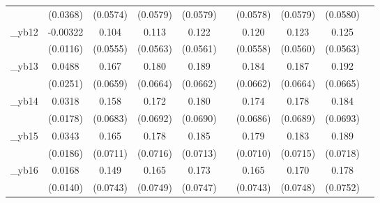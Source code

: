 \begin{table}[htbp]
\begin{tabular}{l*{9}{c}}
            &    (0.0368)         &    (0.0574)         &    (0.0579)         &    (0.0579)         &                     &    (0.0578)         &    (0.0579)         &    (0.0580)         &                     \\
[1em]
\_yb12       &    -0.00322         &       0.104\sym{*}  &       0.113\sym{**} &       0.122\sym{**} &                     &       0.120\sym{**} &       0.123\sym{**} &       0.125\sym{**} &                     \\
            &    (0.0116)         &    (0.0555)         &    (0.0563)         &    (0.0561)         &                     &    (0.0558)         &    (0.0560)         &    (0.0563)         &                     \\
[1em]
\_yb13       &      0.0488\sym{*}  &       0.167\sym{**} &       0.180\sym{***}&       0.189\sym{***}&                     &       0.184\sym{***}&       0.187\sym{***}&       0.192\sym{***}&                     \\
            &    (0.0251)         &    (0.0659)         &    (0.0664)         &    (0.0662)         &                     &    (0.0662)         &    (0.0664)         &    (0.0665)         &                     \\
[1em]
\_yb14       &      0.0318\sym{*}  &       0.158\sym{**} &       0.172\sym{**} &       0.180\sym{***}&                     &       0.174\sym{**} &       0.178\sym{**} &       0.184\sym{***}&                     \\
            &    (0.0178)         &    (0.0683)         &    (0.0692)         &    (0.0690)         &                     &    (0.0686)         &    (0.0689)         &    (0.0693)         &                     \\
[1em]
\_yb15       &      0.0343\sym{*}  &       0.165\sym{**} &       0.178\sym{**} &       0.185\sym{***}&                     &       0.179\sym{**} &       0.183\sym{**} &       0.189\sym{***}&                     \\
            &    (0.0186)         &    (0.0711)         &    (0.0716)         &    (0.0713)         &                     &    (0.0710)         &    (0.0715)         &    (0.0718)         &                     \\
[1em]
\_yb16       &      0.0168         &       0.149\sym{**} &       0.165\sym{**} &       0.173\sym{**} &                     &       0.165\sym{**} &       0.170\sym{**} &       0.178\sym{**} &                     \\
            &    (0.0140)         &    (0.0743)         &    (0.0749)         &    (0.0747)         &                     &    (0.0743)         &    (0.0748)         &    (0.0752)         &                     \\

\end{tabular}
\end{table}
